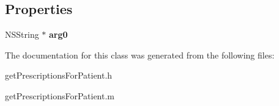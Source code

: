 \subsection*{Properties}
\begin{DoxyCompactItemize}
\item 
\hypertarget{interfaceget_prescriptions_for_patient_a6da3c8597a8daf695f6056bf9e5c3d58}{}N\+S\+String $\ast$ {\bfseries arg0}\label{interfaceget_prescriptions_for_patient_a6da3c8597a8daf695f6056bf9e5c3d58}

\end{DoxyCompactItemize}


The documentation for this class was generated from the following files\+:\begin{DoxyCompactItemize}
\item 
get\+Prescriptions\+For\+Patient.\+h\item 
get\+Prescriptions\+For\+Patient.\+m\end{DoxyCompactItemize}
